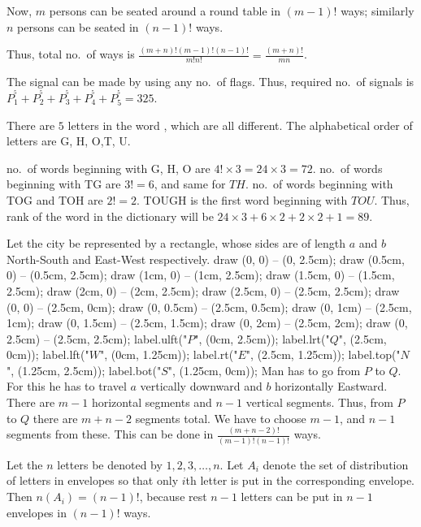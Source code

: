   Now, $m$ persons can be seated around a round table in $(m - 1)!$ ways; similarly $n$ persons can be
  seated in $(n - 1)!$ ways.

  Thus, total no.\ of ways is $\frac{(m + n)!(m - 1)!(n - 1)!}{m!n!} = \frac{(m + n)!}{mn}$.
\item The signal can be made by using any no.\ of flags. Thus, required no.\ of signals is $P_1^^5 + P_2^^5
  + P_3^^5 + P_4^^5 + P_5^^5 = 325$.
\item There are $5$ letters in the word , which are all different. The alphabetical order of
  letters are G, H, O,T, U.

  no.\ of words beginning with G, H, O are $4!\times3 = 24\times3 = 72$. no.\ of words beginning with TG are
  $3! = 6$, and same for $TH$. no.\ of words beginning with TOG and TOH are $2! = 2$. TOUGH is the first word
  beginning with $TOU$. Thus, rank of the word  in the dictionary will be $24\times3 + 6\times2
  + 2\times2 + 1 = 89$.
\item Let the city be represented by a rectangle, whose sides are of length $a$ and $b$ North-South and
  East-West respectively.
  \startplacefigure[location={left,none}]
    \startMPcode
      draw (0, 0) -- (0, 2.5cm);
      draw (0.5cm, 0) -- (0.5cm, 2.5cm);
      draw (1cm, 0) -- (1cm, 2.5cm);
      draw (1.5cm, 0) -- (1.5cm, 2.5cm);
      draw (2cm, 0) -- (2cm, 2.5cm);
      draw (2.5cm, 0) -- (2.5cm, 2.5cm);
      draw (0, 0) -- (2.5cm, 0cm);
      draw (0, 0.5cm) -- (2.5cm, 0.5cm);
      draw (0, 1cm) -- (2.5cm, 1cm);
      draw (0, 1.5cm) -- (2.5cm, 1.5cm);
      draw (0, 2cm) -- (2.5cm, 2cm);
      draw (0, 2.5cm) -- (2.5cm, 2.5cm);
      label.ulft("$P$", (0cm, 2.5cm));
      label.lrt("$Q$", (2.5cm, 0cm));
      label.lft("$W$", (0cm, 1.25cm));
      label.rt("$E$", (2.5cm, 1.25cm));
      label.top("$N$", (1.25cm, 2.5cm));
      label.bot("$S$", (1.25cm, 0cm));
    \stopMPcode
  \stopplacefigure
Man has to go from $P$ to $Q$. For this he has to travel $a$ vertically downward and $b$ horizontally
Eastward. There are $m - 1$ horizontal segments and $n - 1$ vertical segments. Thus, from $P$ to $Q$ there
are $m + n - 2$ segments total. We have to choose $m - 1$, and $n - 1$ segments from these. This can be done
in $\frac{(m + n - 2)!}{(m - 1)!(n - 1)!}$ ways.
\vskip 1.1cm
\item Let the $n$ letters be denoted by $1, 2, 3, \ldots, n$. Let $A_i$ denote the set of distribution of
  letters in envelopes so that only $i$th letter is put in the corresponding envelope. Then $n(A_i) = (n -
  1)!$, because rest $n - 1$ letters can be put in $n - 1$ envelopes in $(n - 1)!$ ways.

